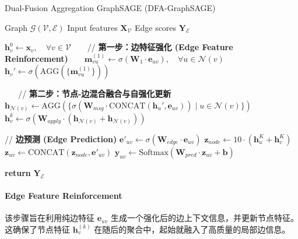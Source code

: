\documentclass{article}
\begin{document}
\begin{algorithm}
  \caption{Dual-Fusion Aggregation GraphSAGE (DFA-GraphSAGE)}
  \label{alg:dfa-sage}
  \begin{algorithmic}[1]
    \Require Graph $\mathcal{G}(\mathcal{V}, \mathcal{E})$ 
    \Require Input features $\mathbf{X}_{\mathcal{V}}$ 
    \Ensure Edge scores $\mathbf{Y}_{\mathcal{E}}$ 

    \State $\mathbf{h}_v^{0} \leftarrow \mathbf{x}_v, \quad \forall v
    \in \mathcal{V}$ 
     
    \State // \textbf{第一步：边特征强化 (Edge Feature Reinforcement)}
    \State $\mathbf{m}_{vu}^{(1)} \leftarrow \sigma(\mathbf{W}_{1}
    \cdot \mathbf{e}_{uv}), \quad \forall u \in \mathcal{N}(v)$
    \State $\mathbf{h}_v' \leftarrow
    \sigma(\text{AGG}(\{\mathbf{m}_{vu}^{(1)}\})) $ 
    \EndFor

    \State // \textbf{第二步：节点-边混合融合与自强化更新}
    \State $\mathbf{h}_{\mathcal{N}(v)} \leftarrow
    \text{AGG}(\{\sigma(\mathbf{W}_{msg} \cdot
    \text{CONCAT}(\mathbf{h}_u', \mathbf{e}_{uv})) \mid u \in \mathcal{N}(v)\})$
    \State $\mathbf{h}_v^k \leftarrow \sigma(\mathbf{W}_{apply} \cdot
    (\mathbf{h}_{\mathcal{N}(v)} + \mathbf{h}_{\mathcal{N}(v)}))$
    \EndFor
    \EndFor

    \State // \textbf{边预测 (Edge Prediction)}
    \State $\mathbf{e}'_{uv} \leftarrow \sigma(\mathbf{W}_{edge}
    \cdot \mathbf{e}_{uv})$
    \State $\mathbf{z}_{node} \leftarrow 10 \cdot (\mathbf{h}_u^K +
    \mathbf{h}_v^K)$ 
    \State $\mathbf{z}_{uv} \leftarrow
    \text{CONCAT}(\mathbf{z}_{node}, \mathbf{e}'_{uv})$
    \State $\mathbf{y}_{uv} \leftarrow
    \text{Softmax}(\mathbf{W}_{pred} \cdot \mathbf{z}_{uv} + \mathbf{b})$
    \EndFor

    \State \textbf{return} $\mathbf{Y}_{\mathcal{E}}$
  \end{algorithmic}
\end{algorithm}

\paragraph{Edge Feature Reinforcement}

该步骤旨在利用纯边特征 $\mathbf{e}_{uv}$ 生成一个强化后的边上下文信息，并更新节点特征。这确保了节点特征
$\mathbf{h}_v^{(k)}$ 在随后的聚合中，起始就融入了高质量的局部边信息。
\end{document}
